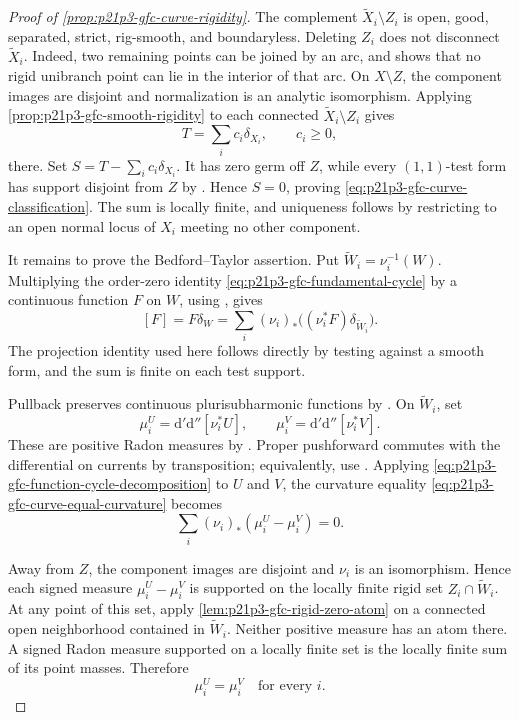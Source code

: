 \begin{proof}[Proof of \cref{prop:p21p3-gfc-curve-rigidity}]
The complement $\widetilde X_i\setminus Z_i$ is open, good, separated,
strict, rig-smooth, and boundaryless.  Deleting $Z_i$ does not disconnect
$\widetilde X_i$.  Indeed, two
remaining points can be joined by an arc, and
\cite[\S1.3.12]{Ducros24CurveStructure} shows that no rigid unibranch
point can lie in the interior of that arc.  On $X\setminus Z$, the component
images are disjoint and normalization is an analytic isomorphism.
Applying \cref{prop:p21p3-gfc-smooth-rigidity} to each connected
$\widetilde X_i\setminus Z_i$ gives
\[
                         T=\sum_i c_i\delta_{X_i},
                         \qquad c_i\geq0,
\]
there.  Set $S=T-\sum_i c_i\delta_{X_i}$.  It has zero germ off $Z$,
while every $(1,1)$-test form has support disjoint from $Z$ by
\cite[Proposition~3.3.6]{CLD25}.  Hence $S=0$, proving
\eqref{eq:p21p3-gfc-curve-classification}.  The sum is locally finite,
and uniqueness follows by restricting to an open normal locus of $X_i$
meeting no other component.

It remains to prove the Bedford--Taylor assertion.  Put
$\widetilde W_i=\nu_i^{-1}(W)$.  Multiplying the order-zero identity
\eqref{eq:p21p3-gfc-fundamental-cycle} by a continuous function $F$ on
$W$, using \cite[Example~7.2.12]{CLD25}, gives
\begin{equation}
\label{eq:p21p3-gfc-function-cycle-decomposition}
 [F]=F\delta_W
     =\sum_i(\nu_i)_*
        \bigl((\nu_i^*F)\delta_{\widetilde W_i}\bigr).
\end{equation}
The projection identity used here follows directly by testing against a
smooth form, and the sum is finite on each test support.

Pullback preserves continuous plurisubharmonic functions by
\cite[Proposition~8.1.5]{CLD25}.  On $\widetilde W_i$, set
\[
 \mu_i^U=\mathrm d'\mathrm d''[\nu_i^*U],
 \qquad
 \mu_i^V=\mathrm d'\mathrm d''[\nu_i^*V].
\]
These are positive Radon measures by \cite[Lemma~8.5.5]{CLD25}.
Proper pushforward commutes with the differential on currents by
transposition; equivalently, use \cite[Proposition~8.5.6]{CLD25}.
Applying \eqref{eq:p21p3-gfc-function-cycle-decomposition} to $U$ and
$V$, the curvature equality
\eqref{eq:p21p3-gfc-curve-equal-curvature} becomes
\begin{equation}
\label{eq:p21p3-gfc-component-measure-sum}
                    \sum_i(\nu_i)_*(\mu_i^U-\mu_i^V)=0.
\end{equation}

Away from $Z$, the component images are disjoint and $\nu_i$ is an
isomorphism.  Hence each signed measure $\mu_i^U-\mu_i^V$ is supported
on the locally finite rigid set $Z_i\cap\widetilde W_i$.  At any point of
this set, apply \cref{lem:p21p3-gfc-rigid-zero-atom} on a connected open
neighborhood contained in $\widetilde W_i$.  Neither positive measure has
an atom there.  A signed Radon measure supported on a locally finite set
is the locally finite sum of its point masses.  Therefore
\begin{equation}
\label{eq:p21p3-gfc-component-measure-equality}
                              \mu_i^U=\mu_i^V
                              \quad\text{for every }i.
\end{equation}


\end{proof}
